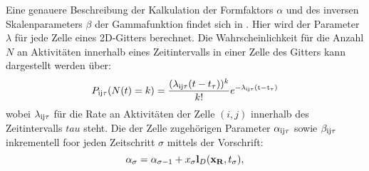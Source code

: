 Eine genauere Beschreibung der Kalkulation der Formfaktors $\alpha$ und des inversen Skalenparameters $\beta$ der Gammafunktion findet sich in \cite{Stuede.2020}. Hier wird der Parameter $\lambda$ für jede Zelle eines 2D-Gitters berechnet. Die Wahrscheinlichkeit
für die Anzahl $N$ an Aktivitäten innerhalb eines Zeitintervalls in einer Zelle des Gitters kann dargestellt werden über:
\begin{equation}
	P_{\mathrm{ij \tau}} (N(t) = k) = \frac{(\lambda_{\mathrm{ij \tau}}(t-t_\tau))^k}{k!} e^{\mathrm{-\lambda_{\mathrm{ij\tau}} (t- t_\tau)}}
\end{equation}
wobei $\lambda_{\mathrm{ij \tau}}$ für die Rate an Aktivitäten der Zelle $(i,j)$ innerhalb des Zeitintervalls $tau$ steht. Die der Zelle zugehörigen Parameter $\alpha_{\mathrm{ij\tau}}$ sowie $\beta_{\mathrm{ij\tau}}$ inkrementell foor jeden Zeitschritt $\sigma$  mittels der Vorschrift:
\begin{equation}
	\alpha_\sigma = \alpha_{\mathrm{\sigma - 1}} + x_\sigma \mathbf{l}_D (\mathbf{x_R}, t_\sigma), 
\end{equation}

